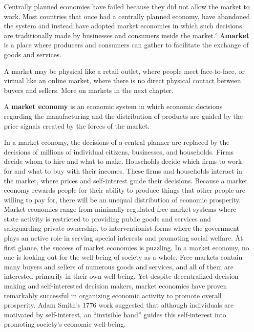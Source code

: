 Centrally planned economies have failed because they did not allow the market to work. Most countries that once had a
centrally planned economy, have abandoned the system and instead have adopted market economies in which such decisions
are traditionally made by businesses and consumers inside the market. \v

\bd[Market] \label{def:market}
A\textbf{market} is a place where producers and consumers can gather to facilitate the exchange of goods and services.
\ed

A market may be physical like a retail outlet, where people meet face-to-face, or virtual like an online market, where
there is no direct physical contact between buyers and sellers. More on markets in the next chapter.

A \textbf{market economy} is an economic system in which economic decisions regarding the manufacturing and the
distribution of products are guided by the price signals created by the forces of the market.
\ed

In a market economy, the decisions of a central planner are replaced by the decisions of millions of individual
citizens, businesses, and households. Firms decide whom to hire and what to make. Households decide which firms to
work for and what to buy with their incomes. These firms and households interact in the market, where prices and
self-interest guide their decisions. Because a market economy rewards people for their ability to produce things that
other people are willing to pay for, there will be an unequal distribution of economic prosperity. \v

Market economies range from minimally regulated free market systems where state activity is restricted to providing
public goods and services and safeguarding private ownership, to interventionist forms where the government plays an
active role in serving special interests and promoting social welfare. \v

At first glance, the success of market economies is puzzling. In a market economy, no one is looking out for the
well-being of society as a whole. Free markets contain many buyers and sellers of numerous goods and services, and
all of them are interested primarily in their own well-being. Yet despite decentralized decision-making and
self-interested decision makers, market economies have proven remarkably successful in organizing economic activity
to promote overall prosperity. Adam Smith's 1776 work suggested that although individuals are motivated by
self-interest, an ``invisible hand'' guides this self-interest into promoting society's economic well-being.

